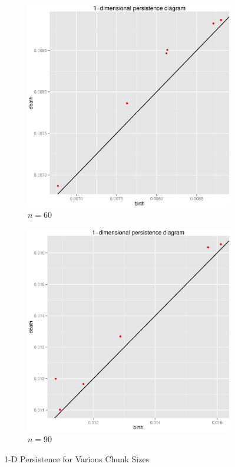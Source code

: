 \documentclass{article}
\begin{document}
\begin{figure}
\begin{subfigure}[htbp]{0.49 \textwidth}
\includegraphics[width = \linewidth]{psqplots/p2-1-60}
\caption{$n = 60$}
\label{p2-1-60}
\end{subfigure}
\begin{subfigure}[htbp]{0.49 \textwidth}
\includegraphics[width = \linewidth]{psqplots/p2-1-90}
\caption{$n = 90$}
\label{p2-1-90}
\end{subfigure}
\label{p2-1}
\caption{1-D Persistence for Various Chunk Sizes}
\end{figure}
\end{document}
